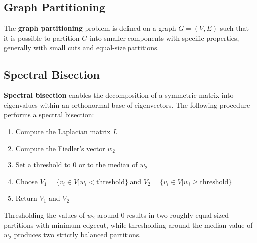 \documentclass{article}
\begin{document}
\subsection{Graph Partitioning}
The \textbf{graph partitioning} problem is defined on a graph $G = (V, E) $ such that it is possible to partition $G$ into smaller components with specific properties, generally with small cuts and equal-size partitions.
\subsection{Spectral Bisection}
\textbf{Spectral bisection} enables the decomposition of a symmetric matrix into eigenvalues within an orthonormal base of eigenvectors. The following procedure performs a spectral bisection:
\begin{enumerate}
    \item Compute the Laplacian matrix $L$
    \item Compute the Fiedler's vector $w_2$
    \item Set a threshold to $0$ or to the median of $w_2$
    \item Choose $V_1 = \{v_i \in V | w_i < \text{threshold}\}$ and $V_2 = \{v_i \in V | w_i \geq \text{threshold}\}$
    \item Return $V_1$ and $V_2$
\end{enumerate}
Thresholding the values of $w_2$ around $0$ results in two roughly equal-sized partitions with minimum edgecut, while thresholding around the median value of $w_2$ produces two strictly balanced partitions.
\end{document}
